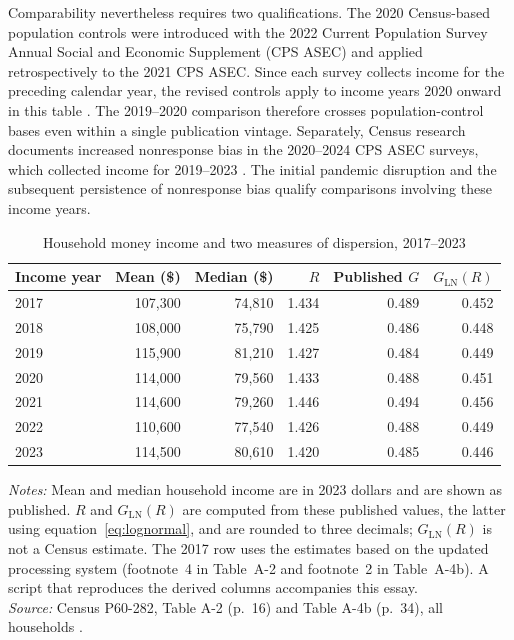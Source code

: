 \documentclass[11pt,a4paper]{article}
\begin{document}
Comparability nevertheless requires two qualifications. The 2020 Census-based population controls were introduced with the 2022 Current Population Survey Annual Social and Economic Supplement (CPS ASEC) and applied retrospectively to the 2021 CPS ASEC. Since each survey collects income for the preceding calendar year, the revised controls apply to income years 2020 onward in this table \cite{censuscontrols}. The 2019--2020 comparison therefore crosses population-control bases even within a single publication vintage. Separately, Census research documents increased nonresponse bias in the 2020--2024 CPS ASEC surveys, which collected income for 2019--2023 \cite{censusnonresponse}. The initial pandemic disruption and the subsequent persistence of nonresponse bias qualify comparisons involving these income years.

\begin{table}[htbp]
\centering
\caption{Household money income and two measures of dispersion, 2017--2023}
\label{tab:income}
\small
\begin{tabular}{@{}lrrrrr@{}}
\toprule
Income year & Mean (\$) & Median (\$) & $R$ & Published $G$ & $G_{\mathrm{LN}}(R)$ \\
\midrule
2017 & 107,300 & 74,810 & 1.434 & 0.489 & 0.452 \\
2018 & 108,000 & 75,790 & 1.425 & 0.486 & 0.448 \\
2019 & 115,900 & 81,210 & 1.427 & 0.484 & 0.449 \\
2020 & 114,000 & 79,560 & 1.433 & 0.488 & 0.451 \\
2021 & 114,600 & 79,260 & 1.446 & 0.494 & 0.456 \\
2022 & 110,600 & 77,540 & 1.426 & 0.488 & 0.449 \\
2023 & 114,500 & 80,610 & 1.420 & 0.485 & 0.446 \\
\bottomrule
\end{tabular}

\vspace{0.6em}
\begin{minipage}{\textwidth}
\footnotesize
\textit{Notes:} Mean and median household income are in 2023 dollars and are shown as published. $R$ and $G_{\mathrm{LN}}(R)$ are computed from these published values, the latter using equation~\eqref{eq:lognormal}, and are rounded to three decimals; $G_{\mathrm{LN}}(R)$ is not a Census estimate. The 2017 row uses the estimates based on the updated processing system (footnote~4 in Table~A-2 and footnote~2 in Table~A-4b). A script that reproduces the derived columns accompanies this essay.\\
\textit{Source:} Census P60-282, Table A-2 (p.~16) and Table A-4b (p.~34), all households \cite{census}.
\end{minipage}
\end{table}
\end{document}
